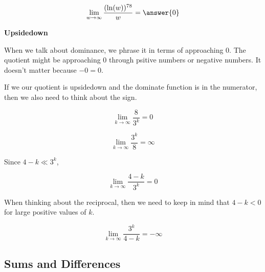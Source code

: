 \documentclass{ximera}
\begin{document}
\begin{question}

\[
\lim\limits_{w \to \infty} \frac{(\ln(w))^{78}}{w} = \answer{0}
\]

\end{question}






\begin{idea} \textbf{\textcolor{blue!55!black}{Upsidedown}}


When we talk about dominance, we phrase it in terms of approaching $0$.  The quotient might be approaching $0$ through psitive numbers or negative numbers.  It doesn't matter because $-0 = 0$.


If we our quotient is upsidedown and the dominate function is in the numerator, then we also need to think about the sign.


\end{idea}



\begin{example}




\[
\lim\limits_{k \to \infty} \frac{8}{3^k} = 0
\]



\[
\lim\limits_{k \to \infty} \frac{3^k}{8} = \infty 
\]




\end{example}









\begin{example}



Since $4 - k \ll 3^k$,

\[
\lim\limits_{k \to \infty} \frac{4 - k}{3^k} = 0
\]


When thinking about the reciprocal, then we need to keep in mind that $4 - k < 0$ for large positive values of $k$.



\[
\lim\limits_{k \to \infty} \frac{3^k}{4 - k} = -\infty 
\]




\end{example}






\subsection*{Sums and Differences}
\end{document}
